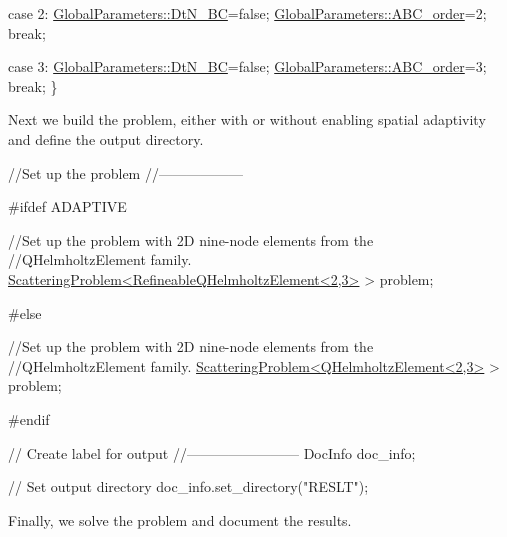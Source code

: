\begin{DoxyCodeInclude}
  \textcolor{keywordflow}{case} 2:
   \hyperlink{namespaceGlobalParameters_a6e2bba1769e86a5d3db88e2c7062bc63}{GlobalParameters::DtN\_BC}=\textcolor{keyword}{false};
   \hyperlink{namespaceGlobalParameters_a552eed3548a269715a95161ad3c4b96a}{GlobalParameters::ABC\_order}=2;
   \textcolor{keywordflow}{break};

  \textcolor{keywordflow}{case} 3:
   \hyperlink{namespaceGlobalParameters_a6e2bba1769e86a5d3db88e2c7062bc63}{GlobalParameters::DtN\_BC}=\textcolor{keyword}{false};
   \hyperlink{namespaceGlobalParameters_a552eed3548a269715a95161ad3c4b96a}{GlobalParameters::ABC\_order}=3;
   \textcolor{keywordflow}{break};
  \}

\end{DoxyCodeInclude}


Next we build the problem, either with or without enabling spatial adaptivity and define the output directory.


\begin{DoxyCodeInclude}
 
 
 \textcolor{comment}{//Set up the problem}
 \textcolor{comment}{//------------------}
 
\textcolor{preprocessor}{#ifdef ADAPTIVE}
 
 \textcolor{comment}{//Set up the problem with 2D nine-node elements from the}
 \textcolor{comment}{//QHelmholtzElement family.}
 \hyperlink{classScatteringProblem}{ScatteringProblem<RefineableQHelmholtzElement<2,3>} > 
  problem;
 
\textcolor{preprocessor}{#else}
 
 \textcolor{comment}{//Set up the problem with 2D nine-node elements from the}
 \textcolor{comment}{//QHelmholtzElement family. }
 \hyperlink{classScatteringProblem}{ScatteringProblem<QHelmholtzElement<2,3>} > 
  problem;
 

\textcolor{preprocessor}{#endif}
 
 \textcolor{comment}{// Create label for output}
 \textcolor{comment}{//------------------------}
 DocInfo doc\_info;
 
 \textcolor{comment}{// Set output directory}
 doc\_info.set\_directory(\textcolor{stringliteral}{"RESLT"});

\end{DoxyCodeInclude}


Finally, we solve the problem and document the results.


